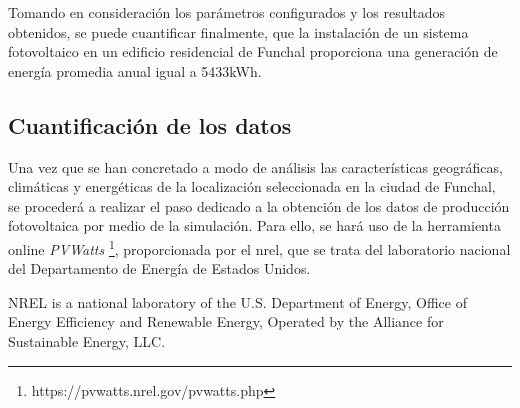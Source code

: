 Tomando en consideración los parámetros configurados y los resultados obtenidos, se puede cuantificar finalmente, que la instalación de un sistema fotovoltaico en un edificio residencial de Funchal proporciona una generación de energía promedia anual igual a 5433kWh.


















 


\subsection{Cuantificación de los datos}

Una vez que se han concretado a modo de análisis las características geográficas, climáticas y energéticas de la localización seleccionada en la ciudad de Funchal, se procederá a realizar el paso dedicado a la obtención de los datos de producción fotovoltaica por medio de la simulación. Para ello, se hará uso de la herramienta online \textit{PVWatts} \footnote{https://pvwatts.nrel.gov/pvwatts.php}, proporcionada por el \gls{nrel}, que se trata del laboratorio nacional del Departamento de Energía de Estados Unidos.




NREL is a national laboratory of the U.S. Department of Energy, Office of Energy Efficiency and Renewable Energy,
Operated by the Alliance for Sustainable Energy, LLC.
